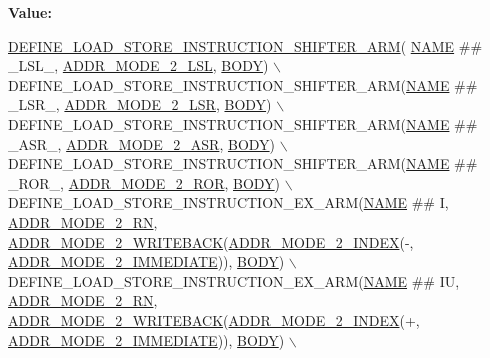 {\bfseries Value\+:}
\begin{DoxyCode}
\mbox{\hyperlink{isa-arm_8c_a566d428e5e9b821adeab6881cad8e100}{DEFINE\_LOAD\_STORE\_INSTRUCTION\_SHIFTER\_ARM}}(
      \mbox{\hyperlink{inflate_8h_a164ea0159d5f0b5f12a646f25f99eceaa67bc2ced260a8e43805d2480a785d312}{NAME}} ## \_LSL\_, \mbox{\hyperlink{isa-arm_8c_a3eaad6b803c92180598a98e9d706453a}{ADDR\_MODE\_2\_LSL}}, \mbox{\hyperlink{gzlog_8c_aa6bdf6a6d9916c343e1e17774d84a156}{BODY}}) \(\backslash\)
    DEFINE\_LOAD\_STORE\_INSTRUCTION\_SHIFTER\_ARM(\mbox{\hyperlink{inflate_8h_a164ea0159d5f0b5f12a646f25f99eceaa67bc2ced260a8e43805d2480a785d312}{NAME}} ## \_LSR\_, \mbox{\hyperlink{isa-arm_8c_a8d15dc58f1451c9397fe0e2017976826}{ADDR\_MODE\_2\_LSR}}, 
      \mbox{\hyperlink{gzlog_8c_aa6bdf6a6d9916c343e1e17774d84a156}{BODY}}) \(\backslash\)
    DEFINE\_LOAD\_STORE\_INSTRUCTION\_SHIFTER\_ARM(\mbox{\hyperlink{inflate_8h_a164ea0159d5f0b5f12a646f25f99eceaa67bc2ced260a8e43805d2480a785d312}{NAME}} ## \_ASR\_, \mbox{\hyperlink{isa-arm_8c_ada13cb8a55fb5c07e68d39c1e71145e6}{ADDR\_MODE\_2\_ASR}}, 
      \mbox{\hyperlink{gzlog_8c_aa6bdf6a6d9916c343e1e17774d84a156}{BODY}}) \(\backslash\)
    DEFINE\_LOAD\_STORE\_INSTRUCTION\_SHIFTER\_ARM(\mbox{\hyperlink{inflate_8h_a164ea0159d5f0b5f12a646f25f99eceaa67bc2ced260a8e43805d2480a785d312}{NAME}} ## \_ROR\_, \mbox{\hyperlink{isa-arm_8c_aaca37bb8bd19deeb47a5427bef082525}{ADDR\_MODE\_2\_ROR}}, 
      \mbox{\hyperlink{gzlog_8c_aa6bdf6a6d9916c343e1e17774d84a156}{BODY}}) \(\backslash\)
    DEFINE\_LOAD\_STORE\_INSTRUCTION\_EX\_ARM(\mbox{\hyperlink{inflate_8h_a164ea0159d5f0b5f12a646f25f99eceaa67bc2ced260a8e43805d2480a785d312}{NAME}} ## I, \mbox{\hyperlink{isa-arm_8c_aa70b435f484716b425cd7376e52d9320}{ADDR\_MODE\_2\_RN}}, 
      \mbox{\hyperlink{isa-arm_8c_a6cbeb951edc491533b2b648bb318961b}{ADDR\_MODE\_2\_WRITEBACK}}(\mbox{\hyperlink{isa-arm_8c_a2521ae1da803e2179985f57ede8ad83f}{ADDR\_MODE\_2\_INDEX}}(-, 
      \mbox{\hyperlink{isa-arm_8c_a0d73c54154259ea56e296afbbd43246a}{ADDR\_MODE\_2\_IMMEDIATE}})), \mbox{\hyperlink{gzlog_8c_aa6bdf6a6d9916c343e1e17774d84a156}{BODY}}) \(\backslash\)
    DEFINE\_LOAD\_STORE\_INSTRUCTION\_EX\_ARM(\mbox{\hyperlink{inflate_8h_a164ea0159d5f0b5f12a646f25f99eceaa67bc2ced260a8e43805d2480a785d312}{NAME}} ## IU, \mbox{\hyperlink{isa-arm_8c_aa70b435f484716b425cd7376e52d9320}{ADDR\_MODE\_2\_RN}}, 
      \mbox{\hyperlink{isa-arm_8c_a6cbeb951edc491533b2b648bb318961b}{ADDR\_MODE\_2\_WRITEBACK}}(\mbox{\hyperlink{isa-arm_8c_a2521ae1da803e2179985f57ede8ad83f}{ADDR\_MODE\_2\_INDEX}}(+, 
      \mbox{\hyperlink{isa-arm_8c_a0d73c54154259ea56e296afbbd43246a}{ADDR\_MODE\_2\_IMMEDIATE}})), \mbox{\hyperlink{gzlog_8c_aa6bdf6a6d9916c343e1e17774d84a156}{BODY}}) \(\backslash\)

\end{DoxyCode}

